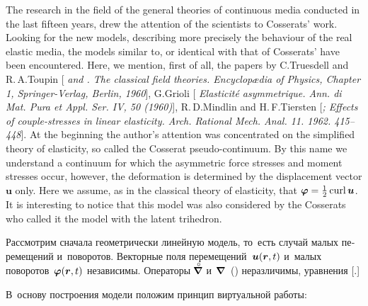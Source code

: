 \begin{otherlanguage}{russian}
\begin{tcolorbox}[breakable, enhanced, colback = orange!8, before upper={\parindent3.2ex}, parbox = false]
The research in the field of the general theories of continuous media conducted in the last fifteen years, drew the attention of the scientists to Cosserats’ work. Looking for the new models, describing more precisely the behaviour of the real elastic media, the models similar to, or identical with that of Cosserats’ have been encountered. Here, we mention, first of all, the papers by C.\:Truesdell and R.\,A.\;Toupin [\textit{ and . The classical field theories. Encyclopædia of Physics, Chapter 1, Springer\hbox{-}Verlag, Berlin, 1960}], G.\:Grioli [\textit{ Elasticité asymmetrique. Ann. di Mat. Pura et Appl. Ser. IV, 50 (1960)}], R.\,D.\;Mindlin and H.\,F.\;Tiersten [\textit{;  Effects of couple-stresses in linear elasticity. Arch. Rational Mech. Anal. 11. 1962. 415\hbox{--}448}]. At the beginning the author’s attention was concentrated on the simplified theory of elasticity, so called the Cosserat pseudo-continuum. By this name we understand a continuum for which the asymmetric force stresses and moment stresses occur, however, the deformation is determined by the displacement vector $\bm{u}$ only. Here we assume, as in the classical theory of elasticity, that $\bm{\varphi} = \onehalf \operatorname{curl} \bm{u}$. It is interesting to notice that this model was also considered by the Cosserats who called it the model with the latent trihedron.
\par
\end{tcolorbox}

\vspace{2mm}

Рассмотрим сначала геометрически линейную модель, то~есть случай малых перемещений и~поворотов. Векторные поля перемещений~${\bm{u}(\bm{r},t)}$ и~малых поворотов~${\bm{\varphi}(\bm{r},t)}$ независимы. Операторы ${\hspace{-0.2ex}\boldnablacircled\hspace{0.1ex}}$ и~${\hspace{-0.2ex}\boldnabla\hspace{0.1ex}}$~() неразличимы, уравнения [.]

В~основу построения модели положим принцип виртуальной работы:


\end{otherlanguage}

